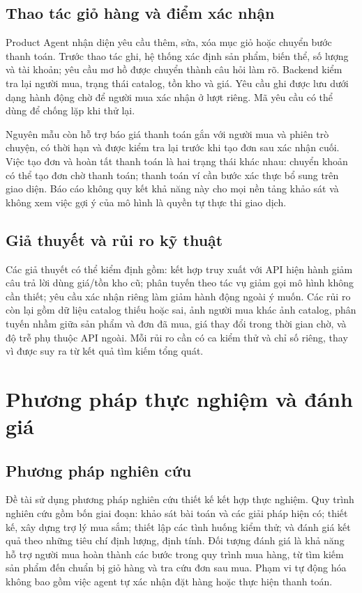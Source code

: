 \documentclass[12pt,a4paper,oneside]{report}
\begin{document}
\section{Thao tác giỏ hàng và điểm xác nhận}
Product Agent nhận diện yêu cầu thêm, sửa, xóa mục giỏ hoặc chuyển bước thanh toán. Trước thao tác ghi, hệ thống xác định sản phẩm, biến thể, số lượng và tài khoản; yêu cầu mơ hồ được chuyển thành câu hỏi làm rõ. Backend kiểm tra lại người mua, trạng thái catalog, tồn kho và giá. Yêu cầu ghi được lưu dưới dạng hành động chờ để người mua xác nhận ở lượt riêng. Mã yêu cầu có thể dùng để chống lặp khi thử lại.

Nguyên mẫu còn hỗ trợ báo giá thanh toán gắn với người mua và phiên trò chuyện, có thời hạn và được kiểm tra lại trước khi tạo đơn sau xác nhận cuối. Việc tạo đơn và hoàn tất thanh toán là hai trạng thái khác nhau: chuyển khoản có thể tạo đơn chờ thanh toán; thanh toán ví cần bước xác thực bổ sung trên giao diện. Báo cáo không quy kết khả năng này cho mọi nền tảng khảo sát và không xem việc gợi ý của mô hình là quyền tự thực thi giao dịch.

\section{Giả thuyết và rủi ro kỹ thuật}
Các giả thuyết có thể kiểm định gồm: kết hợp truy xuất với API hiện hành giảm câu trả lời dùng giá/tồn kho cũ; phân tuyến theo tác vụ giảm gọi mô hình không cần thiết; yêu cầu xác nhận riêng làm giảm hành động ngoài ý muốn. Các rủi ro còn lại gồm dữ liệu catalog thiếu hoặc sai, ảnh người mua khác ảnh catalog, phân tuyến nhầm giữa sản phẩm và đơn đã mua, giá thay đổi trong thời gian chờ, và độ trễ phụ thuộc API ngoài. Mỗi rủi ro cần có ca kiểm thử và chỉ số riêng, thay vì được suy ra từ kết quả tìm kiếm tổng quát.

\chapter{Phương pháp thực nghiệm và đánh giá}
\section{Phương pháp nghiên cứu}
Đề tài sử dụng phương pháp nghiên cứu thiết kế kết hợp thực nghiệm. Quy trình nghiên cứu gồm bốn giai đoạn: khảo sát bài toán và các giải pháp hiện có; thiết kế, xây dựng trợ lý mua sắm; thiết lập các tình huống kiểm thử; và đánh giá kết quả theo những tiêu chí định lượng, định tính. Đối tượng đánh giá là khả năng hỗ trợ người mua hoàn thành các bước trong quy trình mua hàng, từ tìm kiếm sản phẩm đến chuẩn bị giỏ hàng và tra cứu đơn sau mua. Phạm vi tự động hóa không bao gồm việc agent tự xác nhận đặt hàng hoặc thực hiện thanh toán.
\end{document}
